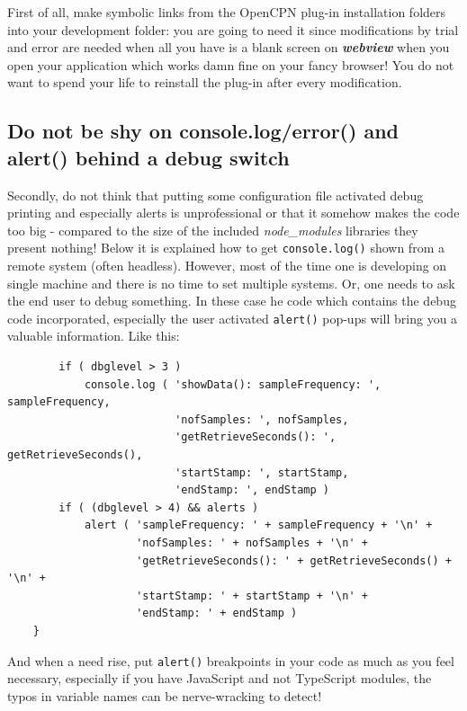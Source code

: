\documentclass[11pt]{article}
\begin{document}
    First of all, make symbolic links from the OpenCPN plug-in installation
folders into your development folder: you are going to need it since
modifications by trial and error are needed when all you have is a blank
screen on \textbf{\emph{webview}} when you open your application which
works damn fine on your fancy browser! You do not want to spend your
life to reinstall the plug-in after every modification.

    \hypertarget{do-not-be-shy-on-console.logerror-and-alert-behind-a-debug-switch}{%
\subsection{Do not be shy on console.log/error() and alert() behind a
debug
switch}\label{do-not-be-shy-on-console.logerror-and-alert-behind-a-debug-switch}}

    Secondly, do not think that putting some configuration file activated
debug printing and especially alerts is unprofessional or that it
somehow makes the code too big - compared to the size of the included
\emph{node\_modules} libraries they present nothing! Below it is
explained how to get \texttt{console.log()} shown from a remote system
(often headless). However, most of the time one is developing on single
machine and there is no time to set multiple systems. Or, one needs to
ask the end user to debug something. In these case he code which
contains the debug code incorporated, especially the user activated
\texttt{alert()} pop-ups will bring you a valuable information. Like
this:

    \begin{verbatim}
        if ( dbglevel > 3 )
            console.log ( 'showData(): sampleFrequency: ', sampleFrequency,
                          'nofSamples: ', nofSamples,
                          'getRetrieveSeconds(): ', getRetrieveSeconds(),
                          'startStamp: ', startStamp,
                          'endStamp: ', endStamp )
        if ( (dbglevel > 4) && alerts )
            alert ( 'sampleFrequency: ' + sampleFrequency + '\n' +
                    'nofSamples: ' + nofSamples + '\n' +
                    'getRetrieveSeconds(): ' + getRetrieveSeconds() + '\n' +
                    'startStamp: ' + startStamp + '\n' +
                    'endStamp: ' + endStamp )
    }
\end{verbatim}

    And when a need rise, put \texttt{alert()} breakpoints in your code as
much as you feel necessary, especially if you have JavaScript and not
TypeScript modules, the typos in variable names can be nerve-wracking to
detect!
\end{document}
